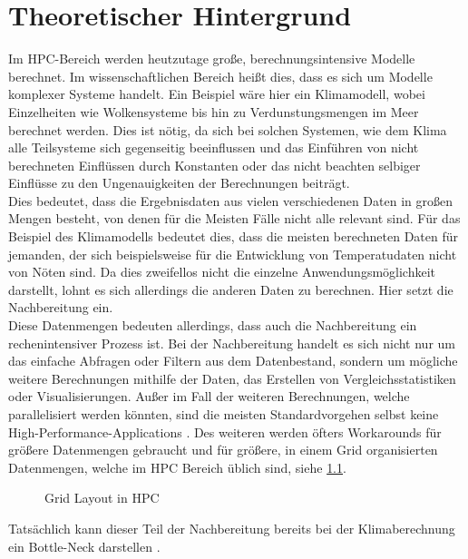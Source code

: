 \documentclass[
	12pt,
	a4paper,
	BCOR10mm,
	DIV14,
	listof=totoc,
	bibliography=totoc,
	headsepline
]{scrreprt}
\begin{document}


\chapter{Theoretischer Hintergrund}
\label{Theoretischer Hintergrund}
Im HPC-Bereich werden heutzutage große, berechnungsintensive Modelle berechnet. 
Im wissenschaftlichen Bereich heißt dies, dass es sich um Modelle komplexer Systeme handelt.
Ein Beispiel wäre hier ein Klimamodell, wobei Einzelheiten wie Wolkensysteme bis hin zu Verdunstungsmengen im Meer berechnet werden.
Dies ist nötig, da sich bei solchen Systemen, wie dem Klima alle Teilsysteme sich gegenseitig beeinflussen und das Einführen von nicht berechneten Einflüssen durch Konstanten oder das nicht beachten selbiger Einflüsse zu den Ungenauigkeiten der Berechnungen beiträgt. \\
Dies bedeutet, dass die Ergebnisdaten aus vielen verschiedenen Daten in großen Mengen besteht, von denen für die Meisten Fälle nicht alle relevant sind.
Für das Beispiel des Klimamodells bedeutet dies, dass die meisten berechneten Daten für jemanden, der sich beispielsweise für die Entwicklung von Temperatudaten nicht von Nöten sind. 
Da dies zweifellos nicht die einzelne Anwendungsmöglichkeit darstellt, lohnt es sich allerdings die anderen Daten zu berechnen.
Hier setzt die Nachbereitung ein. \\
Diese Datenmengen bedeuten allerdings, dass auch die Nachbereitung ein rechenintensiver Prozess ist.
Bei der Nachbereitung handelt es sich nicht nur um das einfache Abfragen oder Filtern aus dem Datenbestand, sondern um mögliche weitere Berechnungen mithilfe der Daten, das Erstellen von Vergleichsstatistiken oder Visualisierungen.
Außer im Fall der weiteren Berechnungen, welche parallelisiert werden könnten, sind die meisten Standardvorgehen selbst keine High-Performance-Applications \cite{ppLargeEarth}.
Des weiteren werden öfters Workarounds für größere Datenmengen gebraucht und für größere, in einem Grid organisierten Datenmengen, welche im HPC Bereich üblich sind, siehe \ref{fig:grid}.
\begin{figure}[ht]
\centering
{}
\caption{Grid Layout in HPC}
\label{fig:grid}
\end{figure}
Tatsächlich kann dieser Teil der Nachbereitung bereits bei der Klimaberechnung ein Bottle-Neck darstellen \cite{HLR} \cite{ppLargeEarth}.
\end{document}
